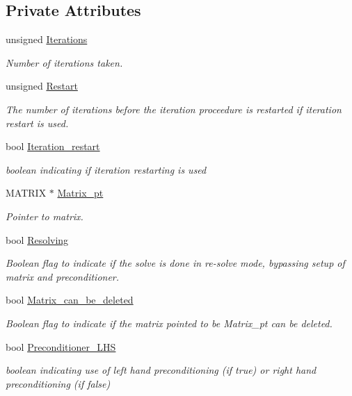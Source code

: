 \subsection*{Private Attributes}
\begin{DoxyCompactItemize}
\item 
unsigned \hyperlink{classoomph_1_1GMRES_a6d261875800a43842579287fa1275ccb}{Iterations}
\begin{DoxyCompactList}\small\item\em Number of iterations taken. \end{DoxyCompactList}\item 
unsigned \hyperlink{classoomph_1_1GMRES_aa45a0faa6609689d44ac0df3dade8db1}{Restart}
\begin{DoxyCompactList}\small\item\em The number of iterations before the iteration proceedure is restarted if iteration restart is used. \end{DoxyCompactList}\item 
bool \hyperlink{classoomph_1_1GMRES_af3eead7d42ad5190cbe6a5510ce352ea}{Iteration\+\_\+restart}
\begin{DoxyCompactList}\small\item\em boolean indicating if iteration restarting is used \end{DoxyCompactList}\item 
M\+A\+T\+R\+IX $\ast$ \hyperlink{classoomph_1_1GMRES_a2edf4333ceb415b8ba9126e1c5d51ce8}{Matrix\+\_\+pt}
\begin{DoxyCompactList}\small\item\em Pointer to matrix. \end{DoxyCompactList}\item 
bool \hyperlink{classoomph_1_1GMRES_a0f520f14d3c16894db4fded7e9dac4f2}{Resolving}
\begin{DoxyCompactList}\small\item\em Boolean flag to indicate if the solve is done in re-\/solve mode, bypassing setup of matrix and preconditioner. \end{DoxyCompactList}\item 
bool \hyperlink{classoomph_1_1GMRES_a4d5464a324bf0a190a5a979f899c8542}{Matrix\+\_\+can\+\_\+be\+\_\+deleted}
\begin{DoxyCompactList}\small\item\em Boolean flag to indicate if the matrix pointed to be Matrix\+\_\+pt can be deleted. \end{DoxyCompactList}\item 
bool \hyperlink{classoomph_1_1GMRES_a19814405efef12cb87cf18b795e55fb4}{Preconditioner\+\_\+\+L\+HS}
\begin{DoxyCompactList}\small\item\em boolean indicating use of left hand preconditioning (if true) or right hand preconditioning (if false) \end{DoxyCompactList}\end{DoxyCompactItemize}
